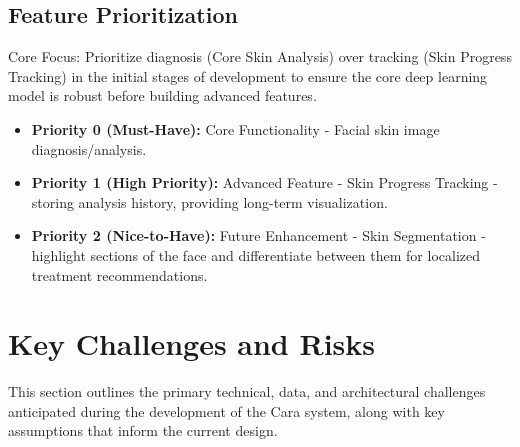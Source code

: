\documentclass[12pt,a4paper]{article}
\begin{document}
\subsection{Feature Prioritization}
Core Focus: Prioritize diagnosis (Core Skin Analysis) over tracking (Skin Progress Tracking) in the initial stages of development to ensure the core deep learning model is robust before building advanced features.
\begin{itemize}
    \item \textbf{Priority 0 (Must-Have):} Core Functionality - Facial skin image diagnosis/analysis.
    \item \textbf{Priority 1 (High Priority):} Advanced Feature - Skin Progress Tracking - storing analysis history, providing long-term visualization.
    \item \textbf{Priority 2 (Nice-to-Have):} Future Enhancement - Skin Segmentation - highlight sections of the face and differentiate between them for localized treatment recommendations.
\end{itemize}

\section{Key Challenges and Risks}
This section outlines the primary technical, data, and architectural challenges anticipated during the development of the Cara system, along with key assumptions that inform the current design.
\end{document}
